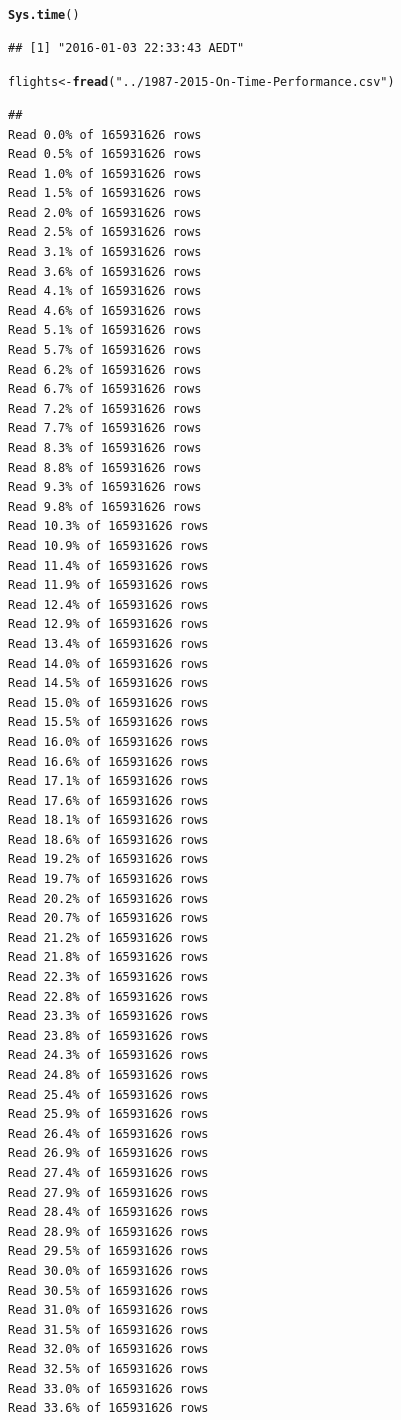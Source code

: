 \documentclass{scrreprt}\usepackage[]{graphicx}\usepackage[]{color}
\makeatletter
\newcommand{\hlstr}[1]{\textcolor[rgb]{0.192,0.494,0.8}{#1}}%
\newcommand{\hlstd}[1]{\textcolor[rgb]{0.345,0.345,0.345}{#1}}%
\newcommand{\hlkwb}[1]{\textcolor[rgb]{0.69,0.353,0.396}{#1}}%
\newcommand{\hlkwd}[1]{\textcolor[rgb]{0.737,0.353,0.396}{\textbf{#1}}}%
\newenvironment{kframe}{%
 \def\at@end@of@kframe{}%
 \ifinner\ifhmode%
  \def\at@end@of@kframe{\end{minipage}}%
  \begin{minipage}{\columnwidth}%
 \fi\fi%
 \def\FrameCommand##1{\hskip\@totalleftmargin \hskip-\fboxsep
 \colorbox{shadecolor}{##1}\hskip-\fboxsep
     \hskip-\linewidth \hskip-\@totalleftmargin \hskip\columnwidth}%
 \MakeFramed {\advance\hsize-\width
   \@totalleftmargin\z@ \linewidth\hsize
   \@setminipage}}%
 {\par\unskip\endMakeFramed%
 \at@end@of@kframe}
\newenvironment{knitrout}{}{} %
\makeatother
\begin{document}
\begin{knitrout}
\color{fgcolor}\begin{kframe}
\begin{alltt}
\hlkwd{Sys.time}\hlstd{()}
\end{alltt}
\begin{verbatim}
## [1] "2016-01-03 22:33:43 AEDT"
\end{verbatim}
\begin{alltt}
\hlstd{flights} \hlkwb{<-} \hlkwd{fread}\hlstd{(}\hlstr{"../1987-2015-On-Time-Performance.csv"}\hlstd{)}
\end{alltt}
\begin{verbatim}
## 
Read 0.0% of 165931626 rows
Read 0.5% of 165931626 rows
Read 1.0% of 165931626 rows
Read 1.5% of 165931626 rows
Read 2.0% of 165931626 rows
Read 2.5% of 165931626 rows
Read 3.1% of 165931626 rows
Read 3.6% of 165931626 rows
Read 4.1% of 165931626 rows
Read 4.6% of 165931626 rows
Read 5.1% of 165931626 rows
Read 5.7% of 165931626 rows
Read 6.2% of 165931626 rows
Read 6.7% of 165931626 rows
Read 7.2% of 165931626 rows
Read 7.7% of 165931626 rows
Read 8.3% of 165931626 rows
Read 8.8% of 165931626 rows
Read 9.3% of 165931626 rows
Read 9.8% of 165931626 rows
Read 10.3% of 165931626 rows
Read 10.9% of 165931626 rows
Read 11.4% of 165931626 rows
Read 11.9% of 165931626 rows
Read 12.4% of 165931626 rows
Read 12.9% of 165931626 rows
Read 13.4% of 165931626 rows
Read 14.0% of 165931626 rows
Read 14.5% of 165931626 rows
Read 15.0% of 165931626 rows
Read 15.5% of 165931626 rows
Read 16.0% of 165931626 rows
Read 16.6% of 165931626 rows
Read 17.1% of 165931626 rows
Read 17.6% of 165931626 rows
Read 18.1% of 165931626 rows
Read 18.6% of 165931626 rows
Read 19.2% of 165931626 rows
Read 19.7% of 165931626 rows
Read 20.2% of 165931626 rows
Read 20.7% of 165931626 rows
Read 21.2% of 165931626 rows
Read 21.8% of 165931626 rows
Read 22.3% of 165931626 rows
Read 22.8% of 165931626 rows
Read 23.3% of 165931626 rows
Read 23.8% of 165931626 rows
Read 24.3% of 165931626 rows
Read 24.8% of 165931626 rows
Read 25.4% of 165931626 rows
Read 25.9% of 165931626 rows
Read 26.4% of 165931626 rows
Read 26.9% of 165931626 rows
Read 27.4% of 165931626 rows
Read 27.9% of 165931626 rows
Read 28.4% of 165931626 rows
Read 28.9% of 165931626 rows
Read 29.5% of 165931626 rows
Read 30.0% of 165931626 rows
Read 30.5% of 165931626 rows
Read 31.0% of 165931626 rows
Read 31.5% of 165931626 rows
Read 32.0% of 165931626 rows
Read 32.5% of 165931626 rows
Read 33.0% of 165931626 rows
Read 33.6% of 165931626 rows

\end{verbatim}
\end{kframe}
\end{knitrout}
\end{document}
